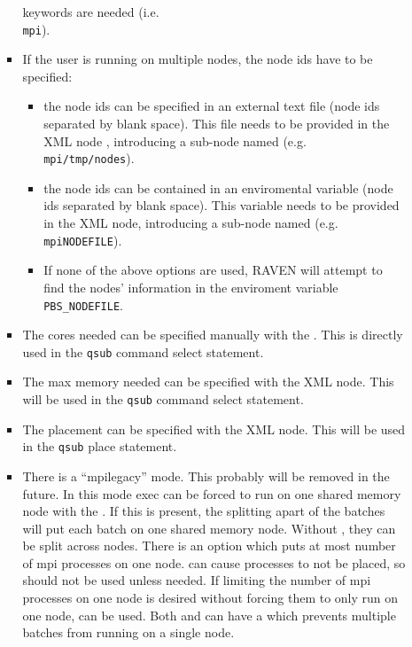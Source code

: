 \begin{itemize}
\begin{itemize}
\begin{itemize}
             keywords are needed (i.e.\\
             \texttt{mpi}).
           \item If the user is running on multiple nodes, the node ids have
             to be specified:
           \begin{itemize}
              \item the node ids can be specified in an external text file
                (node ids separated by blank space).
                This file needs to be provided in the XML node ,
                introducing a sub-node named  (e.g.\\
\texttt{mpi}\texttt{/tmp/nodes}).
              \item the node ids can be contained in an enviromental variable
                (node ids separated by blank space).
                This variable needs to be provided in the  XML
                node, introducing a sub-node named  (e.g.\\
\texttt{mpi}\texttt{NODEFILE}).
                \item If none of the above options are used, RAVEN will attempt
                  to find the nodes' information in the enviroment variable
                  \texttt{PBS\_NODEFILE}.
           \end{itemize}
         \item The cores needed can be specified manually with the
           .  This is directly used in the
           \texttt{qsub} command select statement.
         \item The max memory needed can be specified with the
            XML node.  This will be used in the
           \texttt{qsub} command select statement.
         \item The placement can be specified with the 
           XML node.  This will be used in the \texttt{qsub} place
           statement.
         \item There is a ``mpilegacy'' mode.  This probably will be removed in the future.  In this mode exec can be forced to run on one shared memory node with the .  If this is present, the splitting apart of the batches will put each batch on one shared memory node.  Without , they can be split across nodes.  There is an option  which puts at most  number of mpi processes on one node.   can cause processes to not be placed, so  should not be used unless needed.  If limiting the number of mpi processes on one node is desired without forcing them to only run on one node,  can be used.  Both  and   can have a  which prevents multiple batches from running on a single node.

\end{itemize}
\end{itemize}
\end{itemize}
